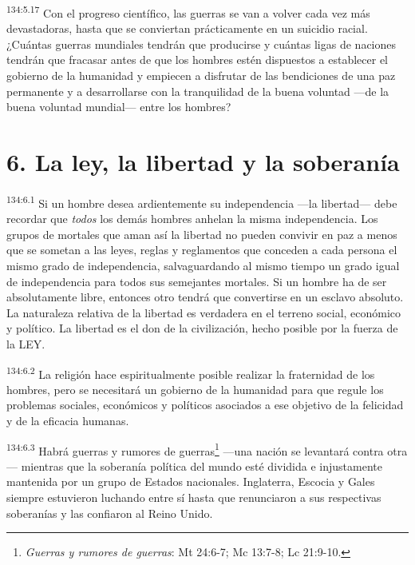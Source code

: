 \par 
\textsuperscript{134:5.17} Con el progreso científico, las guerras se van a volver cada vez más devastadoras, hasta que se conviertan prácticamente en un suicidio racial. ¿Cuántas guerras mundiales tendrán que producirse y cuántas ligas de naciones tendrán que fracasar antes de que los hombres estén dispuestos a establecer el gobierno de la humanidad y empiecen a disfrutar de las bendiciones de una paz permanente y a desarrollarse con la tranquilidad de la buena voluntad ---de la buena voluntad mundial--- entre los hombres?

\section*{6. La ley, la libertad y la soberanía}
\par 
\textsuperscript{134:6.1} Si un hombre desea ardientemente su independencia ---la libertad--- debe recordar que \textit{todos} los demás hombres anhelan la misma independencia. Los grupos de mortales que aman así la libertad no pueden convivir en paz a menos que se sometan a las leyes, reglas y reglamentos que conceden a cada persona el mismo grado de independencia, salvaguardando al mismo tiempo un grado igual de independencia para todos sus semejantes mortales. Si un hombre ha de ser absolutamente libre, entonces otro tendrá que convertirse en un esclavo absoluto. La naturaleza relativa de la libertad es verdadera en el terreno social, económico y político. La libertad es el don de la civilización, hecho posible por la fuerza de la LEY.

\par 
\textsuperscript{134:6.2} La religión hace espiritualmente posible realizar la fraternidad de los hombres, pero se necesitará un gobierno de la humanidad para que regule los problemas sociales, económicos y políticos asociados a ese objetivo de la felicidad y de la eficacia humanas.

\par 
\textsuperscript{134:6.3} Habrá guerras y rumores de guerras\footnote{\textit{Guerras y rumores de guerras}: Mt 24:6-7; Mc 13:7-8; Lc 21:9-10.} ---una nación se levantará contra otra--- mientras que la soberanía política del mundo esté dividida e injustamente mantenida por un grupo de Estados nacionales. Inglaterra, Escocia y Gales siempre estuvieron luchando entre sí hasta que renunciaron a sus respectivas soberanías y las confiaron al Reino Unido.

